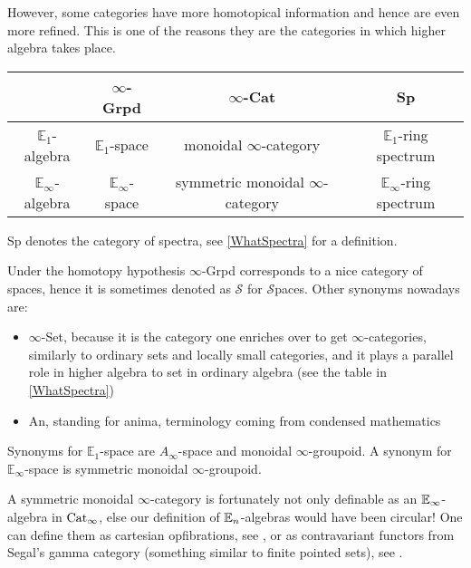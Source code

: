 However, some categories have more homotopical information and hence 
are even more refined. This is one of the reasons they are the categories
in which higher algebra takes place.
\begin{center}
    \begin{tabular}{|c||c|c|c|}
        \hline
        \phantom{h} & $\infty$-Grpd & $\infty$-Cat & Sp \\ [0.5ex]
        \hline\hline
        $\mathbb{E}_1$-algebra & $\mathbb{E}_1$-space &  monoidal $\infty$-category &  $\mathbb{E}_1$-ring spectrum  \\
        \hline
        $\mathbb{E}_\infty$-algebra & $\mathbb{E}_\infty$-space & symmetric monoidal $\infty$-category &  $\mathbb{E}_\infty$-ring spectrum \\
        \hline
    \end{tabular}
\end{center}
\begin{notat}
    Sp denotes the category of spectra, see \ref{WhatSpectra} for a definition.
\end{notat}
\begin{notat}
    Under the homotopy hypothesis $\infty$-Grpd corresponds to a nice category of spaces, hence it is 
    sometimes denoted as $\mathscr{S}$ for $\mathscr{S}$paces.
    Other synonyms nowadays are: 
    \begin{itemize}
        \item $\infty$-Set, because it is the category one enriches over to get $\infty$-categories,
        similarly to ordinary sets and locally small categories, and it plays a parallel role in higher algebra to
         set in 
        ordinary algebra (see the table in \ref{WhatSpectra})
        \item An, standing for anima, terminology coming from condensed mathematics
    \end{itemize}
\end{notat}
\begin{notat}
    Synonyms for $\mathbb{E}_1$-space are $A_\infty$-space and monoidal $\infty$-groupoid. A
     synonym for $\mathbb{E}_\infty$-space is
    symmetric monoidal $\infty$-groupoid. 
\end{notat}
\begin{rem}\label{SymmMoninftycat}
A symmetric monoidal $\infty$-category is fortunately not only definable as an $\mathbb{E}_\infty$-algebra in
 $\operatorname{Cat}_\infty$, else our definition of $\mathbb{E}_n$-algebras would have been circular!
One can define them as cartesian opfibrations, see \cite[Section 4]{groth2015short}, or as 
contravariant functors from Segal's gamma category (something similar to finite pointed sets),
see \cite[II.15]{KtheoryHebestreitWagner}.
\end{rem}
